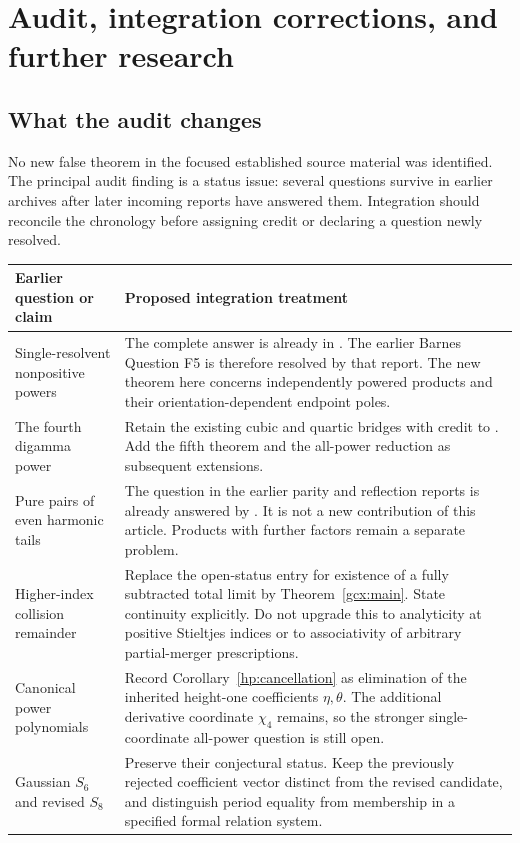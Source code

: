 \documentclass[11pt]{article}
\numberwithin{equation}{section}
\theoremstyle{plain}
\theoremstyle{definition}
\theoremstyle{remark}
\begin{document}
\section{Audit, integration corrections, and further research}
\label{audit:section}

\subsection{What the audit changes}

No new false theorem in the focused established source material was
identified. The principal audit finding is a status issue: several
questions survive in earlier archives after later incoming reports have
answered them. Integration should reconcile the chronology before
assigning credit or declaring a question newly resolved.

\begin{longtable}{>{\raggedright\arraybackslash}p{}
                  >{\raggedright\arraybackslash}p{}}
\toprule
Earlier question or claim & Proposed integration treatment\\
\midrule
\endhead
Single-resolvent nonpositive powers &
The complete answer is already in \cite{repo:quartic}. The earlier
Barnes Question F5 is therefore resolved by that report. The new
theorem here concerns independently powered products and their
orientation-dependent endpoint poles.\\[5pt]
The fourth digamma power &
Retain the existing cubic and quartic bridges with credit to
\cite{repo:cubic,repo:barnes,repo:quartic}. Add the fifth theorem and the
all-power reduction as subsequent extensions.\\[5pt]
Pure pairs of even harmonic tails &
The question in the earlier parity and reflection reports is already
answered by \cite{repo:quartic}. It is not a new contribution of this
article. Products with further factors remain a separate problem.\\[5pt]
Higher-index collision remainder &
Replace the open-status entry for existence of a fully subtracted
total limit by Theorem~\ref{gcx:main}. State continuity explicitly.
Do not upgrade this to analyticity at positive Stieltjes indices or
to associativity of arbitrary partial-merger prescriptions.\\[5pt]
Canonical power polynomials &
Record Corollary~\ref{hp:cancellation} as elimination of the inherited
height-one coefficients $\eta,\theta$. The additional derivative
coordinate $\chi_4$ remains, so the stronger single-coordinate
all-power question is still open.\\[5pt]
Gaussian $S_6$ and revised $S_8$ &
Preserve their conjectural status. Keep the previously rejected
coefficient vector distinct from the revised candidate, and distinguish
period equality from membership in a specified formal relation system.\\
\bottomrule
\end{longtable}
\end{document}
